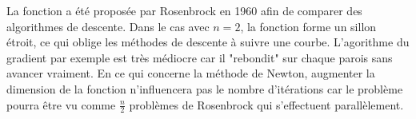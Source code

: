 % 



















La fonction a \'et\'e propos\'ee par Rosenbrock en 1960 afin de comparer des algorithmes de descente. Dans 
le cas avec $n=2$, la fonction forme un sillon \'etroit, ce qui oblige les m\'ethodes de descente \`a suivre une courbe. 
L'agorithme du gradient par exemple est tr\`es m\'ediocre car il "rebondit" sur chaque parois sans avancer vraiment.
En ce qui concerne la m\'ethode de Newton, augmenter la dimension de la fonction n'influencera pas le nombre d'it\'erations
car le probl\`eme pourra être vu comme $\frac{n}{2}$ probl\`emes de Rosenbrock qui s'effectuent parall\`element.








